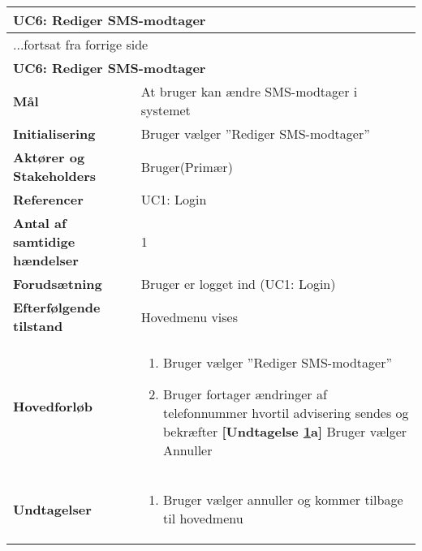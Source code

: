 \begin{center} \centering
	\begin{longtable}{|p{6cm}|p{8cm}|}
	\hline
		\multicolumn{2}{|l|}{\textbf{UC6: Rediger SMS-modtager}} \\\hline
		\endfirsthead
		
		\multicolumn{2}{l}{...fortsat fra forrige side} \\ \hline 
		\multicolumn{2}{|l|}{\textbf{UC6: Rediger SMS-modtager}} \\\hline
		\endhead	
		
\textbf{Mål} &
At bruger kan ændre SMS-modtager i systemet\\\hline

\textbf{Initialisering} &
Bruger vælger ''Rediger SMS-modtager'' \\\hline
 
\textbf{Aktører og Stakeholders} &
Bruger(Primær) \\\hline

\textbf{Referencer} &
UC1: Login  \\\hline

\textbf{Antal af samtidige hændelser} &
1  \\\hline

\textbf{Forudsætning} &
Bruger er logget ind (UC1: Login)\\\hline

\textbf{Efterfølgende tilstand} &
Hovedmenu vises  \\\hline

\textbf{Hovedforløb} &
\begin{enumerate}

\item Bruger vælger ''Rediger SMS-modtager''
\item \label{UC6und1}Bruger fortager ændringer af telefonnummer hvortil advisering sendes og bekræfter \newline
\textbf{[Undtagelse \ref{UC6und1}a]} Bruger vælger Annuller

\end{enumerate}   
 \\\hline
 
\textbf{Undtagelser}
&\begin{enumerate}[label= \ref{UC6und1}a.]
\item Bruger vælger annuller og kommer tilbage til hovedmenu
\end{enumerate}
 \\\hline
 

	\end{longtable}
	\label{UC6} 
\end{center}
